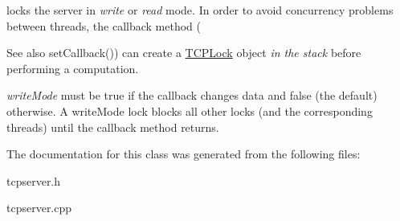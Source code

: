 locks the server in {\itshape write} or {\itshape read} mode. In order to avoid concurrency problems between threads, the callback method ( 

\begin{DoxySeeAlso}{See also}
set\+Callback()) can create a \mbox{\hyperlink{classcppu_1_1_t_c_p_lock}{T\+C\+P\+Lock}} object {\itshape in the stack} before performing a computation.
\end{DoxySeeAlso}
{\itshape write\+Mode} must be true if the callback changes data and false (the default) otherwise. A write\+Mode lock blocks all other locks (and the corresponding threads) until the callback method returns. 

The documentation for this class was generated from the following files\+:\begin{DoxyCompactItemize}
\item 
tcpserver.\+h\item 
tcpserver.\+cpp\end{DoxyCompactItemize}
